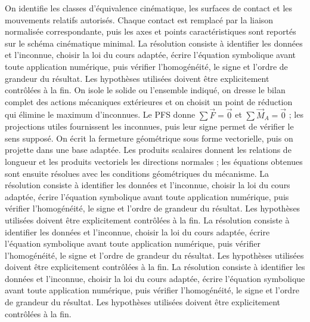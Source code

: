 \begin{corrigebox}[Corrigé]
On identifie les classes d'équivalence cinématique, les surfaces de contact et les mouvements relatifs autorisés. Chaque contact est remplacé par la liaison normalisée correspondante, puis les axes et points caractéristiques sont reportés sur le schéma cinématique minimal.
La résolution consiste à identifier les données et l'inconnue, choisir la loi du cours adaptée, écrire l'équation symbolique avant toute application numérique, puis vérifier l'homogénéité, le signe et l'ordre de grandeur du résultat. Les hypothèses utilisées doivent être explicitement contrôlées à la fin.
On isole le solide ou l'ensemble indiqué, on dresse le bilan complet des actions mécaniques extérieures et on choisit un point de réduction qui élimine le maximum d'inconnues. Le PFS donne $\sum\vec F=\vec0$ et $\sum\vec M_A=\vec0$ ; les projections utiles fournissent les inconnues, puis leur signe permet de vérifier le sens supposé.
On écrit la fermeture géométrique sous forme vectorielle, puis on projette dans une base adaptée. Les produits scalaires donnent les relations de longueur et les produits vectoriels les directions normales ; les équations obtenues sont ensuite résolues avec les conditions géométriques du mécanisme.
La résolution consiste à identifier les données et l'inconnue, choisir la loi du cours adaptée, écrire l'équation symbolique avant toute application numérique, puis vérifier l'homogénéité, le signe et l'ordre de grandeur du résultat. Les hypothèses utilisées doivent être explicitement contrôlées à la fin.
La résolution consiste à identifier les données et l'inconnue, choisir la loi du cours adaptée, écrire l'équation symbolique avant toute application numérique, puis vérifier l'homogénéité, le signe et l'ordre de grandeur du résultat. Les hypothèses utilisées doivent être explicitement contrôlées à la fin.
La résolution consiste à identifier les données et l'inconnue, choisir la loi du cours adaptée, écrire l'équation symbolique avant toute application numérique, puis vérifier l'homogénéité, le signe et l'ordre de grandeur du résultat. Les hypothèses utilisées doivent être explicitement contrôlées à la fin.
\end{corrigebox}
